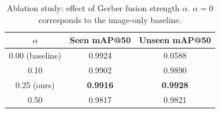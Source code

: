 \begin{table}[t]
\centering
\caption{Ablation study: effect of Gerber fusion strength $\alpha$.
         $\alpha=0$ corresponds to the image-only baseline.}
\label{tab:ablation}
\begin{tabular}{ccc}
\toprule
\textbf{$\alpha$} & \textbf{Seen mAP@50} & \textbf{Unseen mAP@50} \\
\midrule
0.00 (baseline) & 0.9924 & 0.0588 \\
0.10            & 0.9902 & 0.9890 \\
0.25 (ours)     & \textbf{0.9916} & \textbf{0.9928} \\
0.50            & 0.9817 & 0.9821 \\
\bottomrule
\end{tabular}
\end{table}
